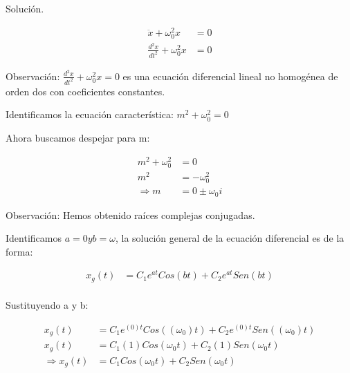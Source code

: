 

 Solución.

 \begin{align*}
    \ddot{x} + \omega_{0}^{2} x &= 0 \\
    \frac{d^{2} x}{dt^{2}} + \omega_{0}^{2} x &= 0 
\end{align*}

Observación: $\frac{d^{2} x}{dt^{2}} + \omega_{0}^{2} x = 0 $ es una ecuación diferencial lineal
no homogénea de orden dos con coeficientes constantes.

\vspace*{0.3 cm}

Identificamos la ecuación característica: $ m^{2} + \omega_{0}^{2} = 0 $

Ahora buscamos despejar para m:

\begin{align*}
    m^{2} + \omega_{0}^{2} &= 0 \\
    m^{2}  &= - \omega_{0}^{2} \\
    \Rightarrow m &= 0 \pm \omega_{0} i
\end{align*}

Observación: Hemos obtenido raíces complejas conjugadas.

\vspace*{0.3 cm}

Identificamos $ a=0 y b=\omega $, la solución general de la ecuación diferencial
es de la forma:

\begin{align*}
    x_{g}(t) &= C_{1}e^{at}Cos(bt) + C_{2}e^{at}Sen(bt) \\
\end{align*}

Sustituyendo a y b:

\begin{align*}
    x_{g}(t) &= C_{1}e^{(0)t}Cos((\omega_{0})t) + C_{2}e^{(0)t}Sen((\omega_{0})t) \\
    x_{g}(t) &= C_{1}(1)Cos(\omega_{0}t) + C_{2}(1)Sen(\omega_{0}t) \\
    \Rightarrow x_{g}(t) &= C_{1}Cos(\omega_{0}t) + C_{2}Sen(\omega_{0}t)
\end{align*}